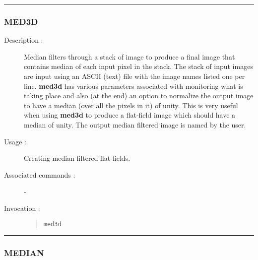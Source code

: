 \hrule
\subsubsection*{\label{MED3D}MED3D}

\begin{description}

\item[Description :] Median filters through a stack of image to produce
a final image that contains median of each input pixel in the stack.
The stack of input images are input using an ASCII (text) file with the
image names listed one per line.  {\bf med3d} has various parameters
associated with monitoring what is taking place and also (at the end)
an option to normalize the output image to have a median (over all the
pixels in it) of unity.  This is very useful when using {\bf med3d} to
produce a flat-field image which should have a median of unity.  The
output median filtered image is named by the user.

\item[Usage :] Creating median filtered flat-fields.
\item[Associated commands :] -
\item[Invocation :]

\begin{quote}{\tt  med3d }\end{quote}

\end{description}

\hrule
\subsubsection*{\label{MEDIAN}MEDIAN}

